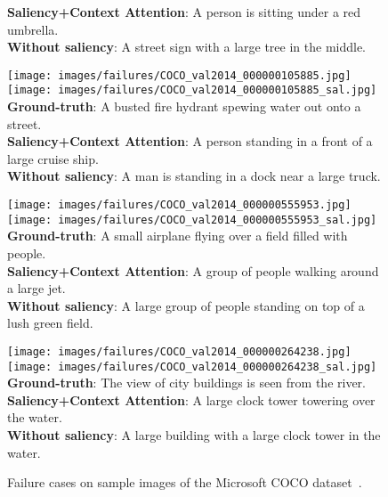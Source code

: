 \begin{figure}[t]
\begin{center}
\begin{minipage}[t]{0.32\linewidth}
{        \textbf{Saliency+Context Attention}: A person is sitting under a red umbrella. \\
        \textbf{Without saliency}: A street sign with a large tree in the middle. \\
    }
    \end{minipage}
    \begin{minipage}[t]{0.32\linewidth}
    \texttt{[image: images/failures/COCO\_val2014\_000000105885.jpg]}  
    \texttt{[image: images/failures/COCO\_val2014\_000000105885\_sal.jpg]}  
    \scriptsize{
        \textbf{Ground-truth}: A busted fire hydrant spewing water out onto a street. \\
        \textbf{Saliency+Context Attention}: A person standing in a front of a large cruise ship. \\
        \textbf{Without saliency}: A man is standing in a dock near a large truck. \\
    }
    \end{minipage}
    \hspace{0.025cm}
    \begin{minipage}[t]{0.32\linewidth}
    \texttt{[image: images/failures/COCO\_val2014\_000000555953.jpg]}  
    \texttt{[image: images/failures/COCO\_val2014\_000000555953\_sal.jpg]}  
    \scriptsize{
        \textbf{Ground-truth}: A small airplane flying over a field filled with people. \\
        \textbf{Saliency+Context Attention}: A group of people walking around a large jet. \\
        \textbf{Without saliency}: A large group of people standing on top of a lush green field. \\
    }
    \end{minipage}
    \hspace{0.025cm}
    \begin{minipage}[t]{0.32\linewidth}
    \texttt{[image: images/failures/COCO\_val2014\_000000264238.jpg]} 
    \texttt{[image: images/failures/COCO\_val2014\_000000264238\_sal.jpg]}  
    \scriptsize{
        \textbf{Ground-truth}: The view of city buildings is seen from the river. \\
        \textbf{Saliency+Context Attention}: A large clock tower towering over the water. \\
        \textbf{Without saliency}: A large building with a large clock tower in the water. \\
    }
    \end{minipage}
\end{center}
\caption{Failure cases on sample images of the Microsoft COCO dataset~\cite{lin2014microsoft}.}
\label{fig:failures}
\end{figure}


